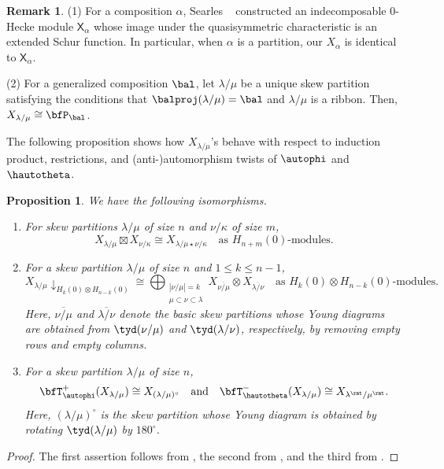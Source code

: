 \documentclass[12pt, reqno]{amsart}
\newtheorem{proposition}[theorem]{Proposition}
\theoremstyle{definition}
\newtheorem{remark}[theorem]{Remark}
\numberwithin{equation}{section} \numberwithin{figure}{section}
\numberwithin{table}{section}
\begin{document}
\begin{remark}


(1) 
For a composition $\alpha$, Searles ~\cite{19Searles}  constructed an indecomposable $0$-Hecke module $\mathsf{X}_\alpha$ whose image under the 
quasisymmetric characteristic is an extended Schur function.
In particular, when $\alpha$ is a partition, our $X_\alpha$ is identical to 
$\mathsf{X}_{\alpha}$.

(2)
For a generalized composition $\bal$, let $\lambda/\mu$ be a unique  skew partition satisfying the conditions that $\balproj(\lambda/\mu) = \bal$ and $\lambda/\mu$ is a ribbon.
Then, $X_{\lambda/\mu} \cong \bfP_\bal$.



\end{remark}


The following proposition shows how $X_{\lambda/\mu}$'s behave with respect to induction product, restrictions, and (anti-)automorphism twists of $\autophi$ and $\hautotheta$.

\begin{proposition}\label{prop: property of X}
We have the following isomorphisms.
\begin{enumerate}[label = {\rm (\arabic*)}]
    \item For skew partitions $\lambda/\mu$ of size $n$ and $\nu/\kappa$ of size $m$, 
    \[
    X_{\lambda/\mu} \boxtimes X_{\nu/\kappa} \cong X_{\lambda/\mu \star \nu/\kappa} \quad \text{as $H_{n+m}(0)$-modules.}
    \]
    \item For a skew partition $\lambda/\mu$ of size $n$ and
     $1 \leq k \leq n-1$, 
    \[
    X_{\lambda/\mu} \downarrow_{H_k(0) \otimes H_{n-k}(0)} \cong \bigoplus_{\substack{|\nu/\mu| = k \\ \mu \subset \nu \subset \lambda}} X_{\overline{\nu/\mu}} \otimes  X_{\overline{\lambda/\nu}} \quad \text{as $H_k(0) \otimes H_{n-k}(0)$-modules}.
    \]
    Here, $\overline{\nu/\mu}$ and $\overline{\lambda/\nu}$ denote the basic skew partitions whose Young diagrams are obtained from $\tyd(\nu/\mu)$ and $\tyd(\lambda/\nu)$, respectively,  by removing empty rows and empty columns.


    \item For a skew partition $\lambda/\mu$ of size $n$,
    \[
\bfT^{+}_\autophi(X_{\lambda/\mu}) \cong X_{(\lambda/\mu)^\circ} \quad \text{and} \quad  \bfT^{-}_\hautotheta(X_{\lambda/\mu}) \cong X_{\lambda^\rmt/\mu^\rmt}.
     \]
Here, $(\lambda/\mu)^\circ$ is the skew partition whose Young diagram is obtained by  rotating $\tyd(\lambda/\mu)$ by $180^\circ$. 
\end{enumerate}
\end{proposition}
\begin{proof}
The first assertion follows from
\cite[Lemma 4]{22JKLO},
the second from \cite[Theorem 2]{22JKLO}, and the third from \cite[Theorem 4]{22JKLO}.
\end{proof}
\end{document}
